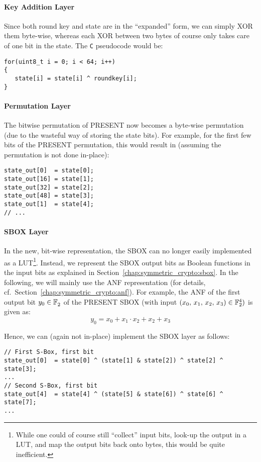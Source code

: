 \paragraph{Key Addition Layer}
Since both round key and state are in the ``expanded'' form, we can simply XOR them byte-wise, whereas each XOR between two bytes of course only takes care of one bit in the state. The \verb+C+ pseudocode would be:
\begin{lstlisting}
for(uint8_t i = 0; i < 64; i++)
{
   state[i] = state[i] ^ roundkey[i];
}
\end{lstlisting}


\paragraph{Permutation Layer}
The bitwise permutation of PRESENT now becomes a byte-wise permutation (due to the wasteful way of storing the state bits). For example, for the first few bits of the PRESENT permutation, this would result in (assuming the permutation is not done in-place):
\lstset{language=C}
\begin{lstlisting}
state_out[0]  = state[0];
state_out[16] = state[1];
state_out[32] = state[2];
state_out[48] = state[3];
state_out[1]  = state[4];
// ...
\end{lstlisting}

\paragraph{\ac{SBOX} Layer}
In the new, bit-wise representation, the \ac{SBOX} can no longer easily implemented as a \ac{LUT}\footnote{While one could of course still ``collect'' input bits, look-up the output in a \ac{LUT}, and map the output bits back onto bytes, this would be quite inefficient.}. Instead, we represent the \ac{SBOX} output bits as Boolean functions in the input bits as explained in Section~\ref{chap:symmetric_crypto:sbox}. In the following, we will mainly use the \acl{ANF} representation (for details, cf.~Section~\ref{chap:symmetric_crypto:anf}). For example, the \ac{ANF} of the first output bit $y_0 \in \mathbb{F}_2^{}$ of the PRESENT \ac{SBOX} (with input $\left(x_0,\,x_1,\,x_2,\,x_3\right) \in \mathbb{F}_2^{4})$ is given as:
$$
y_0 = x_0 + x_1 \cdot x_2 + x_2 + x_3
$$

Hence, we can (again not in-place) implement the \ac{SBOX} layer as follows:
\lstset{language=C}
\begin{lstlisting}
// First S-Box, first bit
state_out[0]  = state[0] ^ (state[1] & state[2]) ^ state[2] ^ state[3];
...
// Second S-Box, first bit
state_out[4]  = state[4] ^ (state[5] & state[6]) ^ state[6] ^ state[7];
...
\end{lstlisting}


